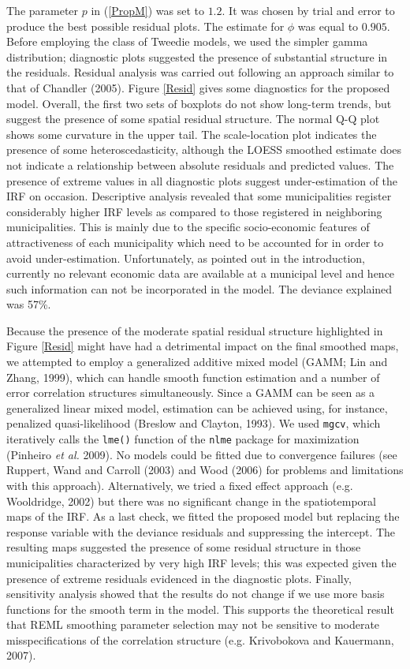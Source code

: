 \documentclass[12pt]{article}
\theoremstyle{definition}
\theoremstyle{plain}
\begin{document}
The parameter $p$ in (\ref{PropM}) was set to $1.2$. It was chosen by trial and error to produce the best possible residual plots. The estimate for $\phi$ was equal to $0.905$. Before employing the class of Tweedie models, we used the simpler gamma distribution; diagnostic plots suggested the presence of substantial structure in the residuals. Residual analysis was carried out following an approach similar to that of Chandler (2005). Figure \ref{Resid} gives some diagnostics for the proposed model. Overall, the first two sets of boxplots do not show long-term trends, but suggest the presence of some spatial residual structure. The normal Q-Q plot shows some curvature in the upper tail. The scale-location plot indicates the presence of some heteroscedasticity, although the LOESS smoothed estimate does not indicate a relationship between absolute residuals and predicted values. The presence of extreme values in all diagnostic plots suggest under-estimation of the IRF on occasion. Descriptive analysis revealed that some municipalities register considerably higher IRF levels as compared to those registered in neighboring municipalities. This is mainly due to the specific socio-economic features of attractiveness of each municipality which need to be accounted for in order to avoid under-estimation. Unfortunately, as pointed out in the introduction, currently no relevant economic data are available at a municipal level and hence such information can not be incorporated in the model. The deviance explained was 57\%. 

Because the presence of the moderate spatial residual structure highlighted in Figure \ref{Resid}  might have had a detrimental impact on the final smoothed maps, we attempted to employ a generalized additive mixed model (GAMM; Lin and Zhang, 1999), which can handle smooth function estimation and a number of error correlation structures simultaneously. Since a GAMM can be seen as a generalized linear mixed model, estimation can be achieved using, for instance, penalized quasi-likelihood (Breslow and Clayton, 1993). We used \texttt{mgcv}, which iteratively calls the \texttt{lme()} function of the \texttt{nlme} package for maximization (Pinheiro \textit{et al.} 2009). No models could be fitted due to convergence failures (see Ruppert, Wand and Carroll (2003) and Wood (2006) for problems and limitations with this approach). Alternatively, we tried a fixed effect approach (e.g. Wooldridge, 2002) but there was no significant change in the spatiotemporal maps of the IRF. As a last check, we fitted the proposed model but replacing the response variable with the deviance residuals and suppressing the intercept. The resulting maps suggested the presence of some residual structure in those municipalities characterized by very high IRF levels; this was expected given the presence of extreme residuals evidenced in the diagnostic plots. Finally, sensitivity analysis showed that the results do not change if we use more basis functions for the smooth term in the model. This supports the theoretical result that REML smoothing parameter selection may not be sensitive to moderate misspecifications of the correlation structure (e.g. Krivobokova and Kauermann, 2007). 
\end{document}
